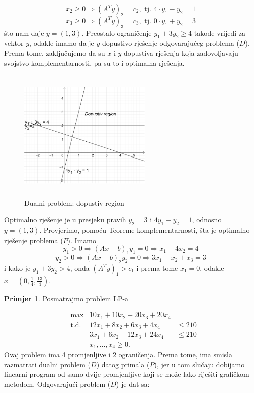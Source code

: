 \documentclass[a4paper, utf8, 11pt, colorlinks]{book}
\theoremstyle{definition}
\newtheorem{primjer}{Primjer}[chapter]
\begin{document}
$$x_2 \geq 0 \Rightarrow  (A^T y)_2  = c_2, \mbox{ tj. } 4 \cdot y_1 - y_2 = 1$$
$$x_3 \geq 0 \Rightarrow  (A^T y)_3  = c_3, \mbox{ tj. } 0 \cdot y_1 + y_2 = 3$$
što nam daje  $y = (1, 3)$. Preostalo ograničenje $y_1 + 3 y_2 \geq 4$ takođe vrijedi za vektor $y$, odakle imamo da je $y$ dopustivo rješenje odgovarajućeg problema  ($D$).  Prema tome, zaključujemo da su $x$ i $y$ dopustiva rješenja koja zadovoljavaju svojstvo komplementarnosti, pa su to i optimalna rješenja. 

\begin{figure}[!ht]
    \centering
     \includegraphics[width=180pt, height=180pt]{fig5.eps}
    \caption{Dualni problem: dopustiv region}
    \label{fig:fig5}
\end{figure}
Optimalno rješenje je u presjeku pravih $y_2 = 3$ i $4y_1 - y_2 = 1$, odnosno $y = (1, 3)$. Provjerimo, pomoću Teoreme komplementarnosti, šta je optimalno rješenje problema ($P$). Imamo 
$$y_1 > 0 \Rightarrow (Ax - b)_1 y_1 = 0 \Rightarrow x_1 + 4 x_2 = 4 $$
$$y_2 > 0 \Rightarrow (Ax - b)_2 y_2 = 0 \Rightarrow 3x_1 - x_2 + x_3 = 3 $$
i kako je $y_1 + 3 y_2 > 4$, onda $(A^Ty)_1 > c_1$ i prema tome $x_1 =0$, 
odakle $x =(0, \frac{1}{4}, \frac{13}{4})$. 

\begin{primjer}\label{primjer:dual} Posmatrajmo problem LP-a
	\end{primjer}
$$\begin{array}{llll}
   &\max                     &10 x_1 + 10 x_2 + 20 x_3 + 20 x_4  & \\
   &\mbox{t.d. }      &12 x_1 + 8 x_2  + 6 x_3  + 4 x_4   & \leq 210 \\
    &                        &3 x_1 + 6 x_2   + 12 x_3 + 24 x_4 & \leq 210 \\
     &                       & x_1,\ldots, x_4 \geq 0.                                 &
\end{array}
$$
Ovaj problem ima 4 promjenljive i 2 ograničenja. Prema tome, ima smisla razmatrati dualni problem  ($D$)  datog primala  ($P$),  jer u tom slučaju dobijamo linearni program od samo dvije promjenljive koji se može lako riješiti grafičkom metodom.  Odgovarajući problem ($D$) je dat sa:
\end{document}
